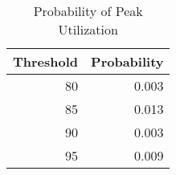 \begin{table}[tb]
\begin{center}
\begin{tabular}{r|r}
\hline \hline
Threshold	& Probability	\\ \hline
80	& 	0.003	\\
85	&	0.013	\\
90	&	0.003	\\
95	& 	0.009	\\
\hline \hline
\end{tabular}
\end{center}
\caption{Probability of Peak Utilization}
\end{table}
